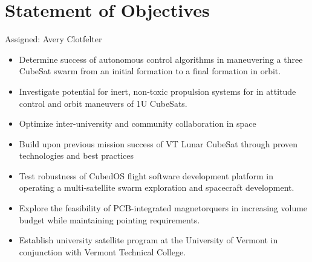 \section{Statement of Objectives}
Assigned: Avery Clotfelter

\begin{itemize}
  \item Determine success of autonomous control algorithms in
    maneuvering a three CubeSat swarm from an initial formation to a
    final formation in orbit.
  \item Investigate potential for inert, non-toxic propulsion systems
    for in attitude control and orbit maneuvers of 1U CubeSats.
  \item Optimize inter-university and community collaboration in space
  \item Build upon previous mission success of VT Lunar CubeSat through proven technologies and best practices
  \item Test robustness of CubedOS flight software development platform in operating a multi-satellite swarm
    exploration and spacecraft development.
  \item Explore the feasibility of PCB-integrated magnetorquers in
    increasing volume budget while maintaining pointing requirements.
  \item Establish university satellite program at the University of
    Vermont in conjunction with Vermont Technical College.
\end{itemize}
